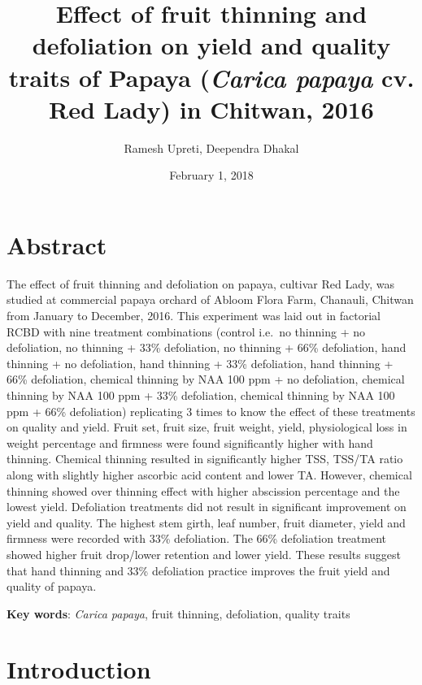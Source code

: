 \documentclass[]{article}
\title{Effect of fruit thinning and defoliation on yield and quality traits of
Papaya (\emph{Carica papaya} cv. Red Lady) in Chitwan, 2016}
\author{Ramesh Upreti, Deependra Dhakal}
\date{February 1, 2018}
\begin{document}
\maketitle

{
\setcounter{tocdepth}{3}
\tableofcontents
}
\section{Abstract}\label{abstract}

The effect of fruit thinning and defoliation on papaya, cultivar Red
Lady, was studied at commercial papaya orchard of Abloom Flora Farm,
Chanauli, Chitwan from January to December, 2016. This experiment was
laid out in factorial RCBD with nine treatment combinations (control
i.e.~no thinning + no defoliation, no thinning + 33\% defoliation, no
thinning + 66\% defoliation, hand thinning + no defoliation, hand
thinning + 33\% defoliation, hand thinning + 66\% defoliation, chemical
thinning by NAA 100 ppm + no defoliation, chemical thinning by NAA 100
ppm + 33\% defoliation, chemical thinning by NAA 100 ppm + 66\%
defoliation) replicating 3 times to know the effect of these treatments
on quality and yield. Fruit set, fruit size, fruit weight, yield,
physiological loss in weight percentage and firmness were found
significantly higher with hand thinning. Chemical thinning resulted in
significantly higher TSS, TSS/TA ratio along with slightly higher
ascorbic acid content and lower TA. However, chemical thinning showed
over thinning effect with higher abscission percentage and the lowest
yield. Defoliation treatments did not result in significant improvement
on yield and quality. The highest stem girth, leaf number, fruit
diameter, yield and firmness were recorded with 33\% defoliation. The
66\% defoliation treatment showed higher fruit drop/lower retention and
lower yield. These results suggest that hand thinning and 33\%
defoliation practice improves the fruit yield and quality of papaya.

\textbf{Key words}: \emph{Carica papaya}, fruit thinning, defoliation,
quality traits

\section{Introduction}\label{introduction}
\end{document}
